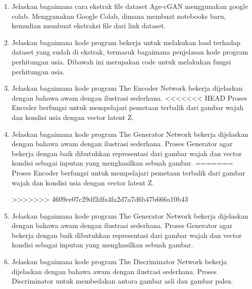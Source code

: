     \begin{enumerate}
	\item Jelaskan bagaimana cara ekstrak ﬁle dataset Age-cGAN menggunakan google colab.
    Menggunakan Google Colab, dimana membuat notebooks baru, kemudian membuat ekstraksi file dari link dataset.
	

	\item Jelaskan bagaimana kode program bekerja untuk melakukan load terhadap dataset yang sudah di ekstrak, termasuk bagaimana penjelasan kode program perhitungan usia.
    Dibawah ini merupakan code untuk melakukan fungsi perhitungan usia.
	

	\item Jelaskan bagaimana kode program The Encoder Network bekerja dijelaskan dengan bahawa awam dengan ilustrasi sederhana.
<<<<<<< HEAD
Proses Encoder berfungsi untuk mempelajari pemetaan terbalik dari gambar wajah dan kondisi usia dengan vector latent Z.

		

	\item Jelaskan bagaimana kode program The Generator Network bekerja dijelaskan dengan bahawa awam dengan ilustrasi sederhana.
Proses Generator agar bekerja dengan baik dibutuhkan representasi dari gambar wajah dan vector kondisi sebagai inputan yang menghasilkan sebuah gambar.
=======
    Proses Encoder berfungsi untuk mempelajari pemetaan terbalik dari gambar wajah dan kondisi usia dengan vector latent Z.
	
>>>>>>> 4609ce07c29df2dfa4fa2d7a7d6b47b666a10b43

	\item Jelaskan bagaimana kode program The Generator Network bekerja dijelaskan dengan bahawa awam dengan ilustrasi sederhana.
    Proses Generator agar bekerja dengan baik dibutuhkan representasi dari gambar wajah dan vector kondisi sebagai inputan yang menghasilkan sebuah gambar.
	

    \item Jelaskan bagaimana kode program The Discriminator Network bekerja dijelaskan dengan bahawa awam dengan ilustrasi sederhana.
    Proses Discriminator untuk membedakan antara gambar asli dan gambar palsu.
	


\end{enumerate}
